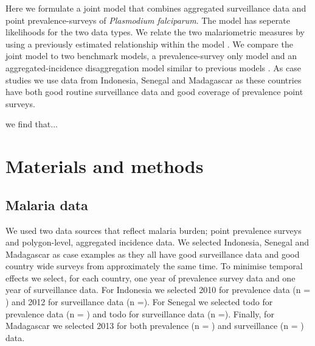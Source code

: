 \documentclass[10pt,letterpaper]{article}
\begin{document}

Here we formulate a joint model that combines aggregated surveillance data and point prevalence-surveys of \emph{Plasmodium falciparum}.
The model has seperate likelihoods for the two data types.
We relate the two malariometric measures by using a previously estimated relationship within the model \cite{cameron2015defining}.
We compare the joint model to two benchmark models, a prevalence-survey only model and an aggregated-incidence disaggregation model similar to previous models \cite{sturrock2014fine, wilson2017pointless}.
As case studies we use data from Indonesia, Senegal and Madagascar as these countries have both good routine surveillance data and good coverage of prevalence point surveys.


we find that...


\section*{Materials and methods}


\subsection*{Malaria data}

We used two data sources that reflect malaria burden; point prevalence surveys and polygon-level, aggregated incidence data.
We selected Indonesia, Senegal and Madagascar as case examples as they all have good surveillance data and good country wide surveys from approximately the same time.
To minimise temporal effects we select, for each country, one year of prevalence survey data and one year of surveillance data.
For Indonesia we selected 2010 for prevalence data (n = ) and 2012 for surveillance data (n =).
For Senegal we selected todo for prevalence data (n = ) and todo for surveillance data (n =).
Finally, for Madagascar we selected 2013 for both prevalence (n = ) and surveillance (n = ) data.
\end{document}
